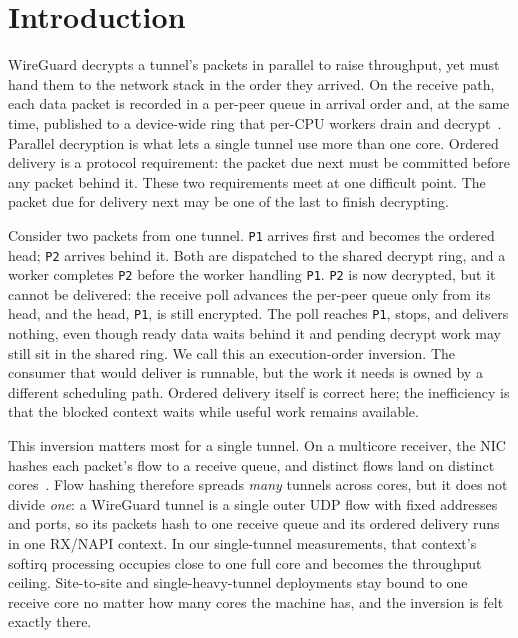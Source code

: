 \section{Introduction}
\label{sec:introduction}

WireGuard decrypts a tunnel's packets in parallel to raise throughput, yet must
hand them to the network stack in the order they arrived. On the receive path,
each data packet is recorded in a per-peer queue in arrival order and, at the
same time, published to a device-wide ring that per-CPU workers drain and
decrypt~\cite{donenfeld2017,wireguard-linux}. Parallel decryption is what lets a
single tunnel use more than one core. Ordered delivery is a protocol
requirement: the packet due next must be committed before any packet behind it.
These two requirements meet at one difficult point. The packet due for delivery
next may be one of the last to finish decrypting.

Consider two packets from one tunnel. \texttt{P1} arrives first and becomes the
ordered head; \texttt{P2} arrives behind it. Both are dispatched to the shared
decrypt ring, and a worker completes \texttt{P2} before the worker handling
\texttt{P1}. \texttt{P2} is now decrypted, but it cannot be delivered: the
receive poll advances the per-peer queue only from its head, and the head,
\texttt{P1}, is still encrypted. The poll reaches \texttt{P1}, stops, and
delivers nothing, even though ready data waits behind it and pending decrypt
work may still sit in the shared ring. We call this an execution-order
inversion. The consumer that would deliver is runnable, but the work it needs is
owned by a different scheduling path. Ordered delivery itself is correct here;
the inefficiency is that the blocked context waits while useful work remains
available.

This inversion matters most for a single tunnel. On a multicore receiver, the
NIC hashes each packet's flow to a receive queue, and distinct flows land on
distinct cores~\cite{linux-napi,salim2001beyond}. Flow hashing therefore spreads
\emph{many} tunnels across cores, but it does not divide \emph{one}: a WireGuard
tunnel is a single outer UDP flow with fixed addresses and ports, so its packets
hash to one receive queue and its ordered delivery runs in one RX/NAPI context.
In our single-tunnel measurements, that context's softirq processing occupies
close to one full core and becomes the throughput ceiling. Site-to-site and
single-heavy-tunnel deployments stay bound to one receive core no matter how
many cores the machine has, and the inversion is felt exactly there.

